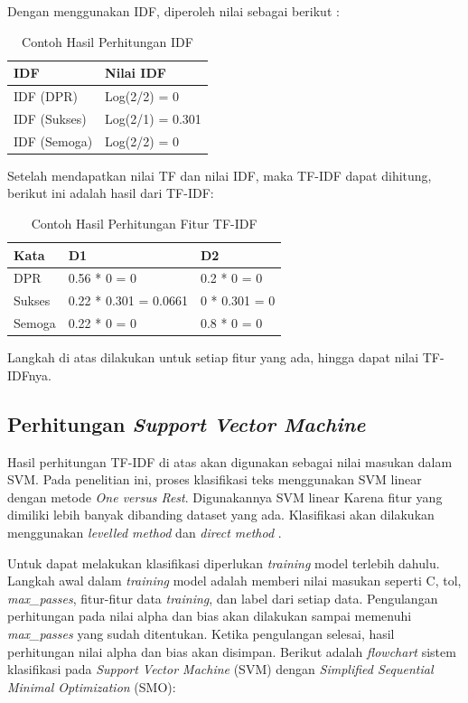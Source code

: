 \noindent Dengan menggunakan IDF, diperoleh nilai sebagai berikut :
\begin{table}[H]
	\caption{Contoh Hasil Perhitungan IDF}
	\centering
	\small
	\begin{adjustbox}{width=1\textwidth}
	\begin{tabular}{|p{7cm}|p{6cm}|}
		\hline
		\textbf{IDF} & \textbf{Nilai IDF} \\
		\hline
		IDF (DPR) & Log(2/2) = 0 \\
		\hline
		IDF (Sukses) & Log(2/1) = 0.301 \\
		\hline
		IDF (Semoga) & Log(2/2) = 0 \\
		\hline
	\end{tabular}
	\end{adjustbox}
\end{table}
Setelah mendapatkan nilai TF dan nilai IDF, maka TF-IDF dapat dihitung, berikut ini adalah hasil dari TF-IDF: 
\begin{table}[H]
	\caption{Contoh Hasil Perhitungan Fitur TF-IDF}
	\centering
	\small
	\begin{adjustbox}{width=1\textwidth}
	\begin{tabular}{|p{4cm}|p{4.25cm}|p{4.25cm}|}
		\hline
		\textbf{Kata}& \textbf{D1} & \textbf{D2} \\
		\hline
		DPR & 0.56 * 0 = 0 & 0.2 * 0 = 0 \\
		\hline
		Sukses & 0.22 * 0.301 = 0.0661 & 0 * 0.301 = 0 \\
		\hline
		Semoga & 0.22 * 0 = 0 & 0.8 * 0 = 0 \\
		\hline
	\end{tabular}
	\end{adjustbox}
\end{table}
\noindent Langkah di atas dilakukan untuk setiap fitur yang ada, hingga dapat nilai TF-IDFnya.
\subsection{Perhitungan \textit{Support Vector Machine}}
Hasil perhitungan TF-IDF di atas akan digunakan sebagai nilai masukan dalam SVM. Pada penelitian ini, proses klasifikasi teks menggunakan SVM linear dengan metode \textit{One versus Rest}. Digunakannya SVM linear Karena fitur yang dimiliki lebih banyak dibanding dataset yang ada. Klasifikasi akan dilakukan menggunakan \textit{levelled method} \cite{5} dan \textit{direct method} \cite{5}.

Untuk dapat melakukan klasifikasi diperlukan \textit{training} model terlebih dahulu. Langkah awal dalam \textit{training }model adalah memberi nilai masukan seperti C, tol, \textit{max\_passes}, fitur-fitur data \textit{training}, dan label dari setiap data. Pengulangan perhitungan pada nilai alpha dan bias akan dilakukan sampai memenuhi \textit{max\_passes }yang sudah ditentukan. Ketika pengulangan selesai, hasil perhitungan nilai alpha dan bias akan disimpan. Berikut adalah \textit{flowchart} sistem klasifikasi pada \textit{Support Vector Machine} (SVM) dengan \textit{Simplified 
Sequential Minimal Optimization }(SMO):

